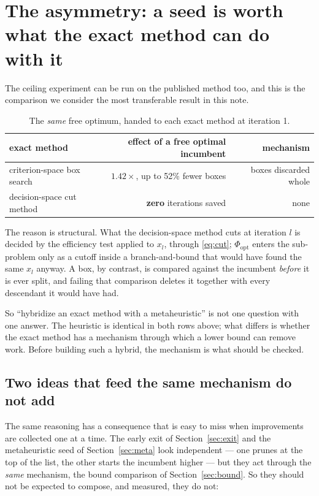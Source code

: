 \documentclass[11pt,a4paper]{article}
\begin{document}
\section{The asymmetry: a seed is worth what the exact method can do with it}
\label{sec:asymmetry}

The ceiling experiment can be run on the published method too, and this is the
comparison we consider the most transferable result in this note.

\begin{table}[h]
\centering
\caption{The \emph{same} free optimum, handed to each exact method at
iteration 1.}
\begin{tabular}{lrr}
\toprule
exact method & effect of a free optimal incumbent & mechanism \\
\midrule
criterion-space box search & $1.42\times$, up to 52\% fewer boxes
  & boxes discarded whole \\
decision-space cut method  & \textbf{zero} iterations saved
  & none \\
\bottomrule
\end{tabular}
\end{table}

\noindent
The reason is structural. What the decision-space method cuts at iteration $l$
is decided by the efficiency test applied to $x_l$, through
\eqref{eq:cut}; $\Phi_{\mathrm{opt}}$ enters the sub-problem only as a cutoff
inside a branch-and-bound that would have found the same $x_l$ anyway. A box,
by contrast, is compared against the incumbent \emph{before} it is ever split,
and failing that comparison deletes it together with every descendant it would
have had.

So ``hybridize an exact method with a metaheuristic'' is not one question with
one answer. The heuristic is identical in both rows above; what differs is
whether the exact method has a mechanism through which a lower bound can remove
work. Before building such a hybrid, the mechanism is what should be checked.

\subsection{Two ideas that feed the same mechanism do not add}
\label{sec:substitutes}

The same reasoning has a consequence that is easy to miss when improvements are
collected one at a time. The early exit of Section~\ref{sec:exit} and the
metaheuristic seed of Section~\ref{sec:meta} look independent --- one prunes at
the top of the list, the other starts the incumbent higher --- but they act
through the \emph{same} mechanism, the bound comparison of
Section~\ref{sec:bound}. So they should not be expected to compose, and
measured, they do not:
\end{document}
